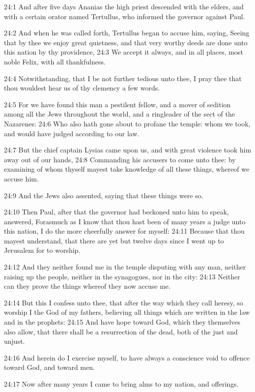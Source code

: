 24:1 And after five days Ananias the high priest descended with the elders, and with a certain orator named Tertullus, who informed the governor against Paul.

24:2 And when he was called forth, Tertullus began to accuse him, saying, Seeing that by thee we enjoy great quietness, and that very worthy deeds are done unto this nation by thy providence, 24:3 We accept it always, and in all places, most noble Felix, with all thankfulness.

24:4 Notwithstanding, that I be not further tedious unto thee, I pray thee that thou wouldest hear us of thy clemency a few words.

24:5 For we have found this man a pestilent fellow, and a mover of sedition among all the Jews throughout the world, and a ringleader of the sect of the Nazarenes: 24:6 Who also hath gone about to profane the temple: whom we took, and would have judged according to our law.

24:7 But the chief captain Lysias came upon us, and with great violence took him away out of our hands, 24:8 Commanding his accusers to come unto thee: by examining of whom thyself mayest take knowledge of all these things, whereof we accuse him.

24:9 And the Jews also assented, saying that these things were so.

24:10 Then Paul, after that the governor had beckoned unto him to speak, answered, Forasmuch as I know that thou hast been of many years a judge unto this nation, I do the more cheerfully answer for myself: 24:11 Because that thou mayest understand, that there are yet but twelve days since I went up to Jerusalem for to worship.

24:12 And they neither found me in the temple disputing with any man, neither raising up the people, neither in the synagogues, nor in the city: 24:13 Neither can they prove the things whereof they now accuse me.

24:14 But this I confess unto thee, that after the way which they call heresy, so worship I the God of my fathers, believing all things which are written in the law and in the prophets: 24:15 And have hope toward God, which they themselves also allow, that there shall be a resurrection of the dead, both of the just and unjust.

24:16 And herein do I exercise myself, to have always a conscience void to offence toward God, and toward men.

24:17 Now after many years I came to bring alms to my nation, and offerings.

